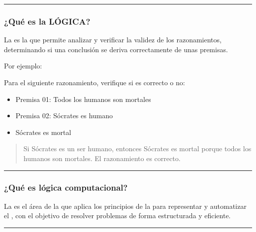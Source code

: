 \documentclass[letterpaper,10pt,spanish]{sphinxmanual}
\begin{document}
\bigskip\hrule\bigskip



\subsubsection{¿Qué es la LÓGICA?}
\label{\detokenize{1_guias/8logica/G821:que-es-la-logica}}
\sphinxAtStartPar
\sphinxfootnotemark[3] La  es la  que permite analizar y verificar la validez de los razonamientos, determinando si una conclusión se deriva correctamente de unas premisas.

\sphinxAtStartPar
Por ejemplo:

\sphinxAtStartPar
Para el siguiente razonamiento, verifique si es correcto o no:
\begin{itemize}
\item {} 
\sphinxAtStartPar
Premisa 01: Todos los humanos son mortales

\item {} 
\sphinxAtStartPar
Premisa 02: Sócrates es humano

\item {} 
\sphinxAtStartPar
{} Sócrates es mortal

\end{itemize}
\begin{quote}

\sphinxAtStartPar
{} Si Sócrates es un ser humano, entonces Sócrates es mortal porque todos los humanos son mortales. El razonamiento es correcto.
\end{quote}


\bigskip\hrule\bigskip



\subsubsection{¿Qué es lógica computacional?}
\label{\detokenize{1_guias/8logica/G821:que-es-logica-computacional}}
\sphinxAtStartPar
\sphinxfootnotemark[3] La  es el área de la  que aplica los principios de la  para representar y automatizar el , con el objetivo de resolver problemas de forma estructurada y eficiente.


\bigskip\hrule\bigskip
\end{document}
